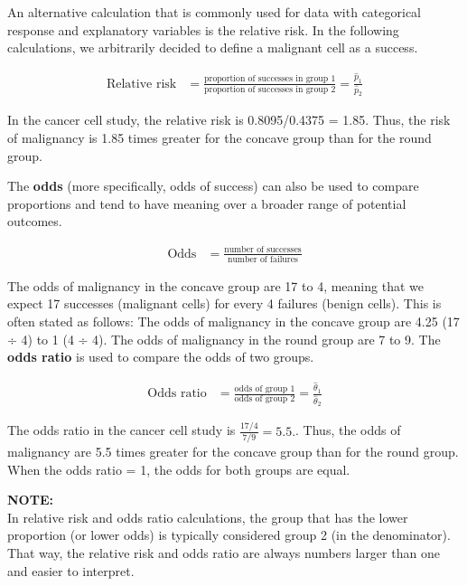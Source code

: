 \documentclass[
]{report}
\begin{document}
An alternative calculation that is commonly used for data with categorical response and explanatory variables is the relative risk. In the following calculations, we arbitrarily decided to define a malignant cell as a success.

\begin{align}\label{5.4}
\text{Relative risk} &= \frac{\text{proportion of successes in group 1}}{\text{proportion of successes in group 2}} = \frac{\hat p_1}{\hat p_2} \tag{5.4}
\end{align}

In the cancer cell study, the relative risk is 0.8095/0.4375 = 1.85. Thus, the risk of malignancy is 1.85 times greater for the concave group than for the round group.

The \textbf{odds} (more specifically, odds of success) can also be used to compare proportions and tend to have meaning over a broader range of potential outcomes.

\begin{align}\label{5.5}
\text{Odds} &= \frac{\text{number of successes}}{\text{number of failures}} \tag{5.5}
\end{align}

The odds of malignancy in the concave group are 17 to 4, meaning that we expect 17 successes (malignant cells) for every 4 failures (benign cells). This is often stated as follows: The odds of malignancy in the concave group are 4.25 (17 ÷ 4) to 1 (4 ÷ 4). The odds of malignancy in the round group are 7 to 9. The \textbf{odds ratio} is used to compare the odds of two groups.

\begin{align}\label{5.6}
\text{Odds ratio} &= \frac{\text{odds of group 1}}{\text{odds of group 2}} = \frac{\hat\theta_1}{\hat\theta_2} \tag{5.6}
\end{align}

The odds ratio in the cancer cell study is \(\frac{17/4}{7/9} = 5.5.\). Thus, the odds of malignancy are 5.5 times greater for the concave group than for the round group. When the odds ratio = 1, the odds for both groups are equal.

\large

\textbf{NOTE:}\\
In relative risk and odds ratio calculations, the group that has the lower proportion (or lower odds) is typically considered group 2 (in the denominator). That way, the relative risk and odds ratio are always numbers larger than one and easier to interpret.\\
\normalsize
\end{document}
